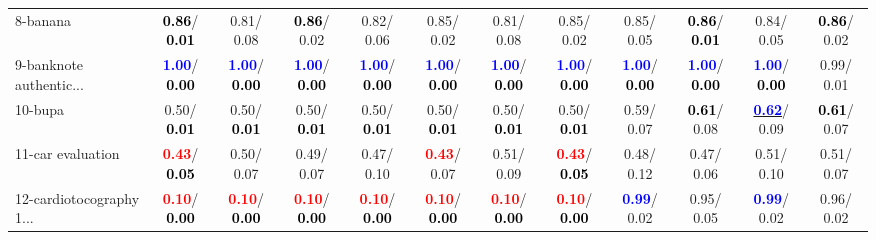 \begin{table}[h]
\begin{center}
{\begin{tabular}{lc|c|c|c|c|c|c|c|c|c|c}
8-banana & \textcolor{black}{\textbf{  0.86}}/\textcolor{black}{\textbf{  0.01}} &   0.81/  0.08 & \textcolor{black}{\textbf{  0.86}}/  0.02 &   0.82/  0.06 &   0.85/  0.02 &   0.81/  0.08 &   0.85/  0.02 &   0.85/  0.05 & \textcolor{black}{\textbf{  0.86}}/\textcolor{black}{\textbf{  0.01}} &   0.84/  0.05 & \textcolor{black}{\textbf{  0.86}}/  0.02 \\
9-banknote authentic... & \textcolor{blue}{\textbf{  1.00}}/\textcolor{black}{\textbf{  0.00}} & \textcolor{blue}{\textbf{  1.00}}/\textcolor{black}{\textbf{  0.00}} & \textcolor{blue}{\textbf{  1.00}}/\textcolor{black}{\textbf{  0.00}} & \textcolor{blue}{\textbf{  1.00}}/\textcolor{black}{\textbf{  0.00}} & \textcolor{blue}{\textbf{  1.00}}/\textcolor{black}{\textbf{  0.00}} & \textcolor{blue}{\textbf{  1.00}}/\textcolor{black}{\textbf{  0.00}} & \textcolor{blue}{\textbf{  1.00}}/\textcolor{black}{\textbf{  0.00}} & \textcolor{blue}{\textbf{  1.00}}/\textcolor{black}{\textbf{  0.00}} & \textcolor{blue}{\textbf{  1.00}}/\textcolor{black}{\textbf{  0.00}} & \textcolor{blue}{\textbf{  1.00}}/\textcolor{black}{\textbf{  0.00}} &   0.99/  0.01 \\
10-bupa &   0.50/\textcolor{black}{\textbf{  0.01}} &   0.50/\textcolor{black}{\textbf{  0.01}} &   0.50/\textcolor{black}{\textbf{  0.01}} &   0.50/\textcolor{black}{\textbf{  0.01}} &   0.50/\textcolor{black}{\textbf{  0.01}} &   0.50/\textcolor{black}{\textbf{  0.01}} &   0.50/\textcolor{black}{\textbf{  0.01}} &   0.59/  0.07 & \textcolor{black}{\textbf{  0.61}}/  0.08 & \underline{\textcolor{blue}{\textbf{  0.62}}}/  0.09 & \textcolor{black}{\textbf{  0.61}}/  0.07 \\
11-car evaluation & \textcolor{red}{\textbf{  0.43}}/\textcolor{black}{\textbf{  0.05}} &   0.50/  0.07 &   0.49/  0.07 &   0.47/  0.10 & \textcolor{red}{\textbf{  0.43}}/  0.07 &   0.51/  0.09 & \textcolor{red}{\textbf{  0.43}}/\textcolor{black}{\textbf{  0.05}} &   0.48/  0.12 &   0.47/  0.06 &   0.51/  0.10 &   0.51/  0.07 \\
12-cardiotocography 1... & \textcolor{red}{\textbf{  0.10}}/\textcolor{black}{\textbf{  0.00}} & \textcolor{red}{\textbf{  0.10}}/\textcolor{black}{\textbf{  0.00}} & \textcolor{red}{\textbf{  0.10}}/\textcolor{black}{\textbf{  0.00}} & \textcolor{red}{\textbf{  0.10}}/\textcolor{black}{\textbf{  0.00}} & \textcolor{red}{\textbf{  0.10}}/\textcolor{black}{\textbf{  0.00}} & \textcolor{red}{\textbf{  0.10}}/\textcolor{black}{\textbf{  0.00}} & \textcolor{red}{\textbf{  0.10}}/\textcolor{black}{\textbf{  0.00}} & \textcolor{blue}{\textbf{  0.99}}/  0.02 &   0.95/  0.05 & \textcolor{blue}{\textbf{  0.99}}/  0.02 &   0.96/  0.02 \\

\end{tabular}}
\end{center}
\end{table}
